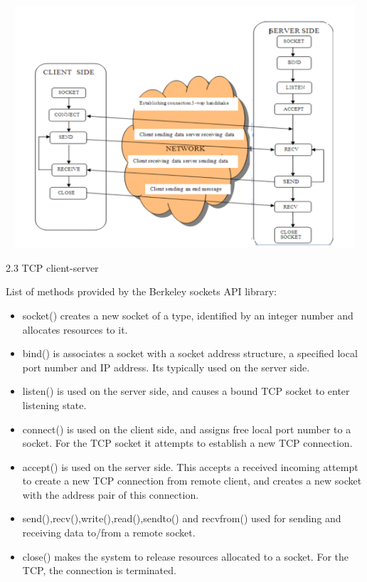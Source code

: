 \documentclass[12pt]{extarticle}
\begin{document}
\begin{center}

    \includegraphics[width=15cm, height=9cm]{TCP client-server}
    
        2.3 TCP client-server
    
\end{center}

List of methods provided by the Berkeley sockets API library:

\begin{itemize}

    \item socket() creates a new socket of a type, identified by an integer number and allocates resources to it.
    \item bind() is associates a socket with a socket address structure, a specified local port number and IP address. Its typically used on the server side.
    \item listen() is used on the server side, and causes a bound TCP socket to enter listening state.
    \item connect() is used on the client side, and assigns free local port number to a socket. For the TCP socket it attempts to establish a new TCP connection.
    \item accept() is used on the server side. This accepts a received incoming attempt to create a new TCP connection from remote client, and creates a new socket with the address pair of this connection.
    \item send(),recv(),write(),read(),sendto() and recvfrom() used for sending and receiving data to/from a remote socket.
    \item close() makes the system to release resources allocated to a socket. For the TCP, the connection is terminated.

\end{itemize}
\end{document}
